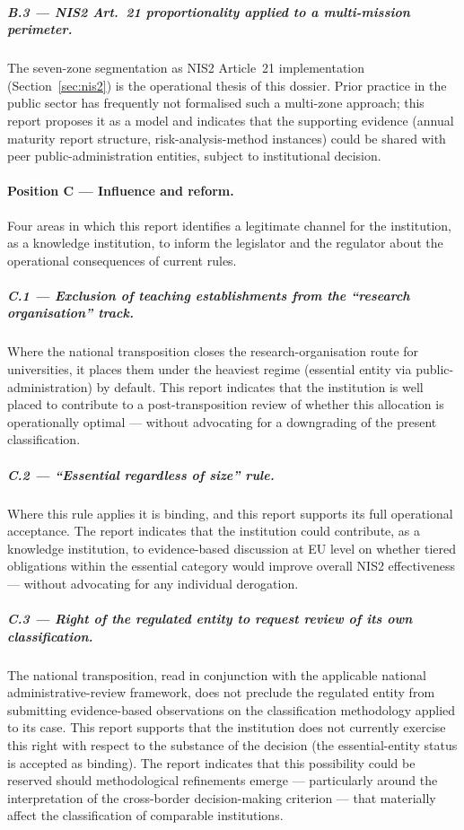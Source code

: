 \subparagraph{B.3 --- NIS2 Art.~21 proportionality applied to a multi-mission perimeter.}
The seven-zone segmentation as NIS2 Article~21 implementation
(Section~\ref{sec:nis2}) is the operational thesis of this
dossier. Prior practice in the public sector has frequently not
formalised such a multi-zone approach; this report proposes it as
a model and indicates that the supporting evidence (annual
maturity report structure, risk-analysis-method instances) could
be shared with peer public-administration entities, subject to
institutional decision.

\paragraph{Position C --- Influence and reform.}
Four areas in which this report identifies a legitimate channel
for the institution, as a knowledge institution, to inform the
legislator and the regulator about the operational consequences
of current rules.

\subparagraph{C.1 --- Exclusion of teaching establishments from the ``research organisation'' track.}
Where the national transposition closes the
research-organisation route for universities, it places them under
the heaviest regime (essential entity via public-administration)
by default. This report indicates that the institution is well
placed to contribute to a post-transposition review of whether
this allocation is operationally optimal --- without advocating
for a downgrading of the present classification.

\subparagraph{C.2 --- ``Essential regardless of size'' rule.}
Where this rule applies it is binding, and this report supports its
full operational acceptance. The report indicates that the institution
could contribute, as a knowledge institution, to evidence-based
discussion at EU level on whether tiered obligations within the
essential category would improve overall NIS2 effectiveness ---
without advocating for any individual derogation.

\subparagraph{C.3 --- Right of the regulated entity to request review of its own classification.}
The national transposition, read in
conjunction with the applicable national administrative-review
framework, does not preclude the regulated
entity from submitting evidence-based observations on the
classification methodology applied to its case. This report
supports that the institution does not currently exercise this
right with respect to the substance of the decision (the
essential-entity status is accepted as binding). The report
indicates that this possibility could be reserved should
methodological refinements emerge --- particularly around the
interpretation of the cross-border
decision-making criterion --- that materially affect the
classification of comparable institutions.

